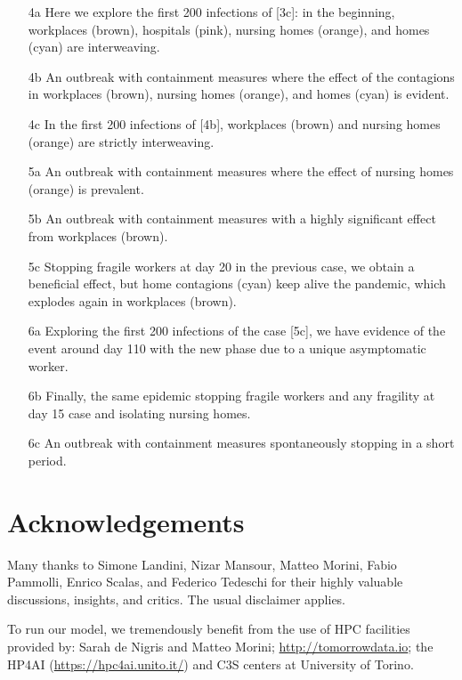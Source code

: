\documentclass[graybox]{svmult}
\begin{document}
\begin{itemize}
\item [4a] Here we explore the first 200 infections of [3c]: in the beginning, workplaces (brown), hospitals (pink), nursing homes (orange), and homes (cyan) are interweaving.
\item [4b] An outbreak with containment measures where the effect of the contagions in workplaces (brown), nursing homes (orange), and homes (cyan) is evident.
\item [4c] In the first 200 infections of [4b], workplaces (brown) and nursing homes (orange) are strictly interweaving.

\item [5a] An outbreak with containment measures where the effect of nursing homes (orange) is prevalent.
\item [5b] An outbreak with containment measures with a highly significant effect from workplaces (brown).
\item [5c] Stopping fragile workers at day 20 in the previous case, we obtain a beneficial effect, but home contagions (cyan) keep alive the pandemic, which explodes again in workplaces (brown).

\item [6a] Exploring the first 200 infections of the case [5c], we have evidence of the event around day 110 with the new phase due to a unique asymptomatic worker.
\item [6b] Finally, the same epidemic stopping fragile workers and any fragility at day 15 case and isolating nursing homes.
\item [6c] An outbreak with containment measures spontaneously stopping in a short period.
\end{itemize}




\section*{Acknowledgements}

Many thanks to Simone Landini, Nizar Mansour, Matteo Morini, Fabio Pammolli, Enrico Scalas, and Federico Tedeschi for their highly valuable discussions, insights, and critics. The usual disclaimer applies.

To run our model, we tremendously benefit from the use of HPC facilities provided by: Sarah de Nigris and Matteo Morini; \href{http://tomorrowdata.io}{http://tomorrowdata.io}; the HP4AI (\href{https://hpc4ai.unito.it/}{https://hpc4ai.unito.it/}) and C3S centers at University of Torino.




\end{document}
